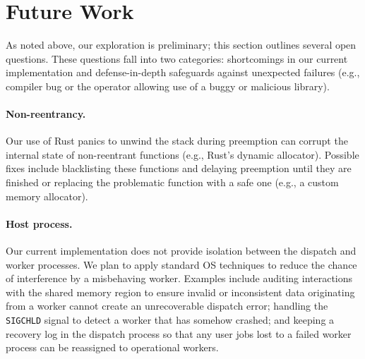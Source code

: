 \section{Future Work}
\label{sec:future}

As noted above, our exploration is preliminary; this section outlines several
open questions.  These questions fall into two categories: shortcomings in our
current implementation and defense-in-depth safeguards against unexpected
failures (e.g., compiler bug or the operator allowing use of a buggy or malicious library).


\paragraph{Non-reentrancy.}
Our use of Rust panics to unwind the stack during preemption can
corrupt the internal state of non-reentrant functions (e.g., Rust's dynamic
allocator).  Possible fixes include blacklisting these functions and delaying
preemption until they are finished or replacing the problematic function with a
safe one (e.g., a custom memory allocator).

\paragraph{Host process.}
Our current implementation does not provide isolation between the dispatch
and worker processes.  We plan to apply standard OS techniques to reduce
the chance of interference by a misbehaving worker.  Examples
include auditing interactions with the shared memory region to ensure invalid
or inconsistent data originating from a worker cannot create an unrecoverable
dispatch error; handling the \texttt{SIGCHLD} signal to detect a worker that has
somehow crashed; and keeping a recovery log in the dispatch process so that any
user jobs lost to a failed worker process can be reassigned to operational
workers.  

